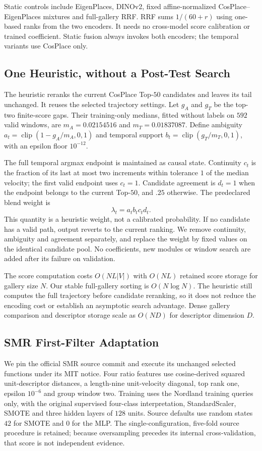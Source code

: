 \documentclass[conference]{IEEEtran}
\begin{document}
Static controls include EigenPlaces, DINOv2, fixed affine-normalized CosPlace--EigenPlaces mixtures and full-gallery RRF. RRF sums $1/(60+r)$ using one-based ranks from the two encoders. It needs no cross-model score calibration or trained coefficient. Static fusion always invokes both encoders; the temporal variants use CosPlace only.

\subsection{One Heuristic, without a Post-Test Search}
The heuristic reranks the current CosPlace Top-$50$ candidates and leaves its tail unchanged. It reuses the selected trajectory settings. Let $g_A$ and $g_T$ be the top-two finite-score gaps. Their training-only medians, fitted without labels on $592$ valid windows, are $m_A=0.02154516$ and $m_T=0.01837087$. Define ambiguity $a_t=\operatorname{clip}(1-g_A/m_A,0,1)$ and temporal support $b_t=\operatorname{clip}(g_T/m_T,0,1)$, with an epsilon floor $10^{-12}$.

The full temporal argmax endpoint is maintained as causal state. Continuity $c_t$ is the fraction of its last at most two increments within tolerance $1$ of the median velocity; the first valid endpoint uses $c_t=1$. Candidate agreement is $d_t=1$ when the endpoint belongs to the current Top-$50$, and $.25$ otherwise. The predeclared blend weight is
\begin{equation}\lambda_t=a_t b_t c_t d_t.\label{eq:adaptive}\end{equation}
This quantity is a heuristic weight, not a calibrated probability. If no candidate has a valid path, output reverts to the current ranking. We remove continuity, ambiguity and agreement separately, and replace the weight by fixed values on the identical candidate pool. No coefficients, new modules or window search are added after its failure on validation.

The score computation costs $O(NL|V|)$ with $O(NL)$ retained score storage for gallery size $N$. Our stable full-gallery sorting is $O(N\log N)$. The heuristic still computes the full trajectory before candidate reranking, so it does not reduce the encoding cost or establish an asymptotic search advantage. Dense gallery comparison and descriptor storage scale as $O(ND)$ for descriptor dimension $D$.

\subsection{SMR First-Filter Adaptation}
We pin the official SMR source commit and execute its unchanged selected functions under its MIT notice. Four ratio features use cosine-derived squared unit-descriptor distances, a length-nine unit-velocity diagonal, top rank one, epsilon $10^{-6}$ and group window two. Training uses the Nordland training queries only, with the original supervised four-class interpretation, StandardScaler, SMOTE and three hidden layers of $128$ units. Source defaults use random states $42$ for SMOTE and $0$ for the MLP. The single-configuration, five-fold source procedure is retained; because oversampling precedes its internal cross-validation, that score is not independent evidence.
\end{document}
